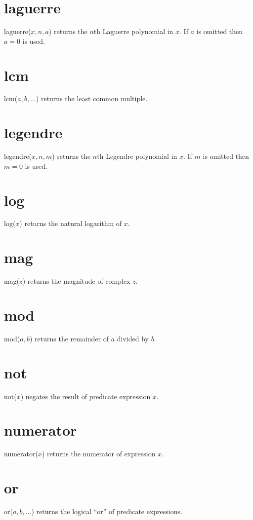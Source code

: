 \documentclass[12pt,openany]{report}
\begin{document}
\section*{laguerre}
laguerre($x,n,a$) returns the $n$th Laguerre polynomial in $x$.
If $a$ is omitted then $a=0$ is used.

\section*{lcm}
lcm($a,b,\ldots$) returns the least common multiple.

\section*{legendre}
legendre($x,n,m$) returns the $n$th Legendre polynomial in $x$.
If $m$ is omitted then $m=0$ is used.

\section*{log}
log($x$) returns the natural logarithm of $x$.

\section*{mag}
mag($z$) returns the magnitude of complex $z$.

\section*{mod}
mod($a,b$) returns the remainder of $a$ divided by $b$.

\section*{not}
not($x$) negates the result of predicate expression $x$.

\section*{numerator}
numerator($x$) returns the numerator of expression $x$.

\section*{or}
or($a,b,\ldots$) returns the logical ``or'' of predicate expressions.
\end{document}

